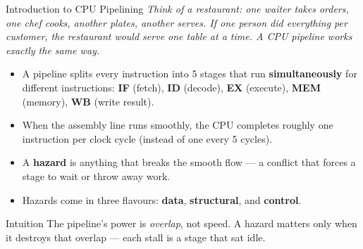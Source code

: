 \documentclass{beamer}
\begin{document}
\begin{frame}{Introduction to CPU Pipelining}
  \textit{Think of a restaurant: one waiter takes orders, one chef cooks,
  another plates, another serves. If one person did everything per customer,
  the restaurant would serve one table at a time. A CPU pipeline works
  exactly the same way.}

  \smallskip
  \begin{itemize}
    \item A pipeline splits every instruction into 5 stages that run
          \textbf{simultaneously} for different instructions:
          \textbf{IF} (fetch), \textbf{ID} (decode), \textbf{EX} (execute),
          \textbf{MEM} (memory), \textbf{WB} (write result).
    \item When the assembly line runs smoothly, the CPU completes roughly
          one instruction per clock cycle (instead of one every 5 cycles).
    \item A \textbf{hazard} is anything that breaks the smooth flow ---
          a conflict that forces a stage to wait or throw away work.
    \item Hazards come in three flavours: \textbf{data}, \textbf{structural},
          and \textbf{control}.
  \end{itemize}

  \begin{block}{Intuition}
    \small The pipeline's power is \emph{overlap}, not speed. A hazard
    matters only when it destroys that overlap --- each stall is a stage
    that sat idle.
  \end{block}
\end{frame}
\end{document}
